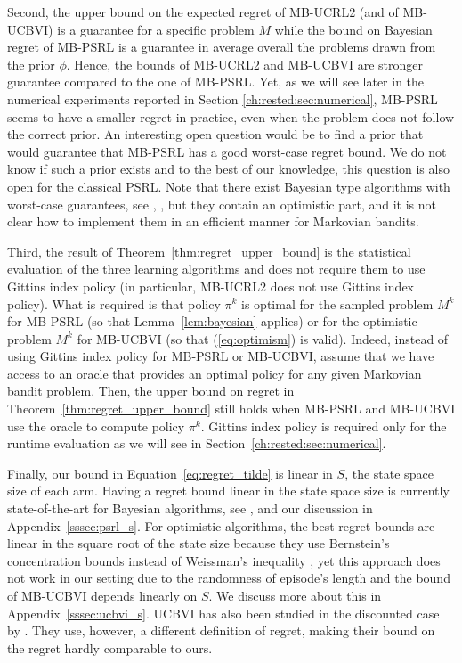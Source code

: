 Second, the upper bound on the expected regret of MB-UCRL2 (and of MB-UCBVI) is a guarantee for a specific problem $M$ while the bound on Bayesian regret of MB-PSRL is a guarantee in average overall the problems drawn from the prior $\phi$. Hence, the bounds of MB-UCRL2 and MB-UCBVI are stronger guarantee compared to the one of MB-PSRL.  Yet, as we will see later in the numerical experiments reported in Section \ref{ch:rested:sec:numerical}, MB-PSRL seems to have a smaller regret in practice, even when the problem does not follow the correct prior.
An interesting open question would be to find a prior that would guarantee that MB-PSRL has a good worst-case regret bound. We do not know if such a prior exists and to the best of our knowledge, this question is also open for the classical PSRL. Note that there exist Bayesian type algorithms with worst-case guarantees, see \eg, \cite{ishfaq2021randomized,agrawal2021improved,wang2020reinforcement,agrawal2017posterior}, but they contain an optimistic part, and it is not clear how to implement them in an efficient manner for Markovian bandits.

Third, the result of Theorem~\ref{thm:regret_upper_bound} is the statistical evaluation of the three learning algorithms and does not require them to use Gittins index policy (in particular, MB-UCRL2 does not use Gittins index policy).
What is required is that policy $\pi^k$ is optimal for the sampled problem $M^k$ for MB-PSRL (so that Lemma~\ref{lem:bayesian} applies) or for the optimistic problem $M^k$ for MB-UCBVI (so that (\ref{eq:optimism}) is valid).
Indeed, instead of using Gittins index policy for MB-PSRL or MB-UCBVI, assume that we have access to an oracle that provides an optimal policy for any given Markovian bandit problem.
Then, the upper bound on regret in Theorem~\ref{thm:regret_upper_bound} still holds when MB-PSRL and MB-UCBVI use the oracle to compute policy $\pi^k$.
Gittins index policy is required only for the runtime evaluation as we will see in Section~\ref{ch:rested:sec:numerical}.

Finally, our bound in Equation~\eqref{eq:regret_tilde} is linear in $S$, the state space size of each arm. Having a regret bound linear in the state space size is currently state-of-the-art for Bayesian algorithms, see \eg, \cite{agrawal2017posterior,ouyang2017learning} and our discussion in Appendix~\ref{sssec:psrl_s}. For optimistic algorithms, the best regret bounds are linear in the square root of the state size because they use  Bernstein's concentration bounds instead of Weissman's inequality \cite{azar2017minimax}, yet this approach does not work in our setting due to the randomness of episode's length and the bound of MB-UCBVI depends linearly on $S$. We discuss more about this in Appendix~\ref{sssec:ucbvi_s}. UCBVI has also been studied in the discounted case by \cite{zhou2021nearly}. They use, however, a different definition of regret, making their bound on the regret hardly comparable to ours.

